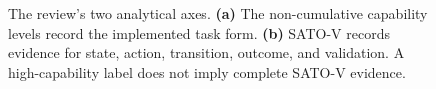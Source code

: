 \begin{figure}[t]
\caption{The review's two analytical axes. \textbf{(a)} The non-cumulative capability levels record the implemented task form. \textbf{(b)} SATO-V records evidence for state, action, transition, outcome, and validation. A high-capability label does not imply complete SATO-V evidence.}
\label{fig:audit}
\end{figure}
